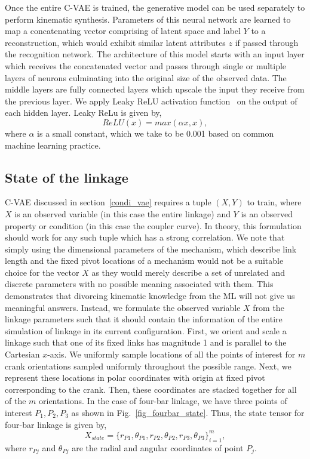 Once the entire C-VAE is trained, the generative model can be used separately to perform kinematic synthesis. Parameters of this neural network are learned to map a concatenating vector comprising of latent space and label $Y$ to a reconstruction, which would exhibit similar latent attributes $z$ if passed through the recognition network.
The architecture of this model starts with an input layer which receives the concatenated vector and passes through single or multiple layers of neurons culminating into the original size of the observed data.
The middle layers are fully connected layers which upscale the input they receive from the previous layer.
We apply Leaky ReLU activation function~\cite{Radford2016UnsupervisedRL} on the output of each hidden layer.
Leaky ReLu is given by,
\begin{equation}
  ReLU(x) = max(\alpha x, x),
\end{equation}
where $\alpha$ is a small constant, which we take to be 0.001 based on common machine learning practice.


\subsection{State of the linkage}\label{sec_linkage_state}
C-VAE discussed in section~\ref{condi_vae} requires a tuple $(X, Y)$ to train, where $X$ is an observed variable (in this case the entire linkage) and $Y$ is an observed property or condition (in this case the coupler curve).
In theory, this formulation should work for any such tuple which has a strong correlation. We note that simply using the dimensional parameters of the mechanism, which describe link length and the fixed pivot locations of a mechanism would not be a suitable choice for the vector $X$ as they would merely describe a set of unrelated and discrete parameters with no possible meaning associated with them. This demonstrates that divorcing kinematic knowledge from the ML will not give us meaningful answers. Instead, we formulate the observed variable $X$ from the linkage parameters such that it should contain the information of the entire simulation of linkage in its current configuration.
First, we orient and scale a linkage such that one of its fixed links has magnitude 1 and is parallel to the Cartesian $x$-axis.
We uniformly sample locations of all the points of interest for $m$ crank orientations sampled uniformly throughout the possible range.
Next, we represent these locations in polar coordinates with origin at fixed pivot corresponding to the crank.
Then, these coordinates are stacked together for all of the $m$ orientations.
In the case of four-bar linkage, we have three points of interest $P_1, P_2, P_3$ as shown in Fig.~\ref{fig_fourbar_state}.
Thus, the state tensor for four-bar linkage is given by,
\begin{equation}
  X_{state} = \{ r_{P1}, \theta_{P1}, r_{P2}, \theta_{P2}, r_{P3}, \theta_{P3}\}_{i=1}^m,
\end{equation}
where $r_{Pj}$ and $\theta_{Pj}$ are the radial and angular coordinates of point $P_j$.

